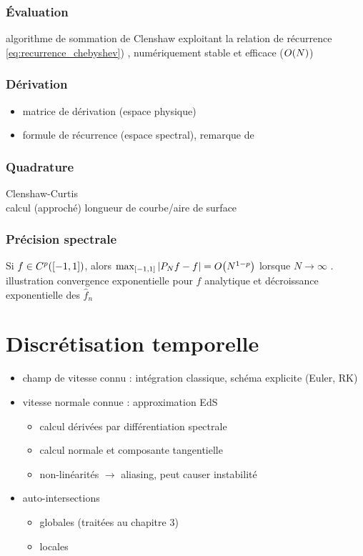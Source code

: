 \subsubsection{Évaluation}
algorithme de sommation de Clenshaw exploitant la relation de récurrence \eqref{eq:recurrence_chebyshev}) \cite{clenshaw1955}, numériquement stable et efficace ($\bigO{N}$)

\subsubsection{Dérivation}
\begin{itemize}
	\item matrice de dérivation (espace physique)
	\item formule de récurrence (espace spectral), remarque de \cite[Section 2.3, p~.94]{wengle1978}%
\end{itemize}

\subsubsection{Quadrature}
Clenshaw-Curtis\\
calcul (approché) longueur de courbe/aire de surface

\subsubsection{Précision spectrale}
Si $f \in C^p(\chebinterval)$, alors $\max_{\chebinterval} \left| \truncseries{f}{N} - f \right| = \bigO{N^{1-p}}$ lorsque $N \to \infty$ \cite[Théorème 5.14]{mason2002}.\\
illustration convergence exponentielle pour $f$ analytique et décroissance exponentielle des $\hat{f}_n$



\section{Discrétisation temporelle}
\begin{itemize}
	\item champ de vitesse connu : intégration classique, schéma explicite (Euler, RK)
	\item vitesse normale connue : approximation EdS
	\begin{itemize}
		\item calcul dérivées par différentiation spectrale
		\item calcul normale et composante tangentielle
		\item non-linéarités $\to$ aliasing, peut causer instabilité \cite{rahimian2015}
	\end{itemize}
	\item auto-intersections
	\begin{itemize}
		\item globales (traitées au chapitre 3)
		\item locales \cite{farouki1986}
	\end{itemize}
\end{itemize}